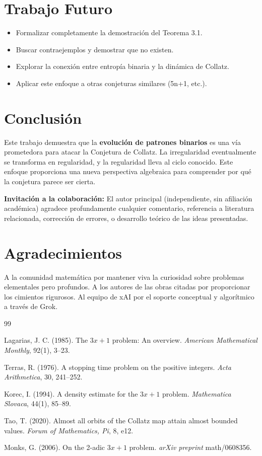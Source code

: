 \documentclass[11pt,a4paper]{article}
\begin{document}
\section{Trabajo Futuro}

\begin{itemize}
    \item Formalizar completamente la demostración del Teorema 3.1.
    \item Buscar contraejemplos y demostrar que no existen.
    \item Explorar la conexión entre entropía binaria y la dinámica de Collatz.
    \item Aplicar este enfoque a otras conjeturas similares (5n+1, etc.).
\end{itemize}

\section{Conclusión}

Este trabajo demuestra que la \textbf{evolución de patrones binarios} es una vía prometedora para atacar la Conjetura de Collatz. La irregularidad eventualmente se transforma en regularidad, y la regularidad lleva al ciclo conocido. Este enfoque proporciona una nueva perspectiva algebraica para comprender por qué la conjetura parece ser cierta.

\vspace{1em}
\noindent\textbf{Invitación a la colaboración:} El autor principal (independiente, sin afiliación académica) agradece profundamente cualquier comentario, referencia a literatura relacionada, corrección de errores, o desarrollo teórico de las ideas presentadas.

\section*{Agradecimientos}
A la comunidad matemática por mantener viva la curiosidad sobre problemas elementales pero profundos. A los autores de las obras citadas por proporcionar los cimientos rigurosos. Al equipo de xAI por el soporte conceptual y algorítmico a través de Grok.

\begin{thebibliography}{99}
\setlength{\itemsep}{0.5em}

Lagarias, J. C. (1985).
The \( 3x + 1 \) problem: An overview.
\textit{American Mathematical Monthly}, 92(1), 3--23.

Terras, R. (1976).
A stopping time problem on the positive integers.
\textit{Acta Arithmetica}, 30, 241--252.

Korec, I. (1994).
A density estimate for the \( 3x+1 \) problem.
\textit{Mathematica Slovaca}, 44(1), 85--89.

Tao, T. (2020).
Almost all orbits of the Collatz map attain almost bounded values.
\textit{Forum of Mathematics, Pi}, 8, e12.

Monks, G. (2006).
On the 2-adic \( 3x+1 \) problem.
\textit{arXiv preprint} math/0608356.

\end{thebibliography}
\end{document}
